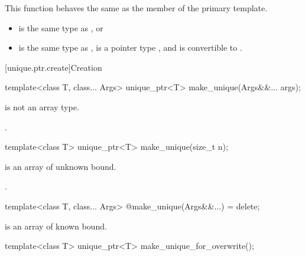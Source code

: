 \begin{itemdescr}
\pnum
This function behaves the same as
the  member of the primary template.

\pnum
\constraints
\begin{itemize}
\item {} is the same type as , or
\item {} is the same type as ,
       is a pointer type , and
       is convertible to .
\end{itemize}
\end{itemdescr}

[unique.ptr.create]{Creation}

%
\begin{itemdecl}
template<class T, class... Args> unique_ptr<T> make_unique(Args&&... args);
\end{itemdecl}

\begin{itemdescr}
\pnum
\constraints
{} is not an array type.

\pnum
\returns
{}.
\end{itemdescr}

%
\begin{itemdecl}
template<class T> unique_ptr<T> make_unique(size_t n);
\end{itemdecl}

\begin{itemdescr}
\pnum
\constraints
{} is an array of unknown bound.

\pnum
\returns
{}.
\end{itemdescr}

%
\begin{itemdecl}
template<class T, class... Args> @\unspec@ make_unique(Args&&...) = delete;
\end{itemdecl}

\begin{itemdescr}
\pnum
\constraints
{} is an array of known bound.
\end{itemdescr}

%
\begin{itemdecl}
template<class T> unique_ptr<T> make_unique_for_overwrite();
\end{itemdecl}

